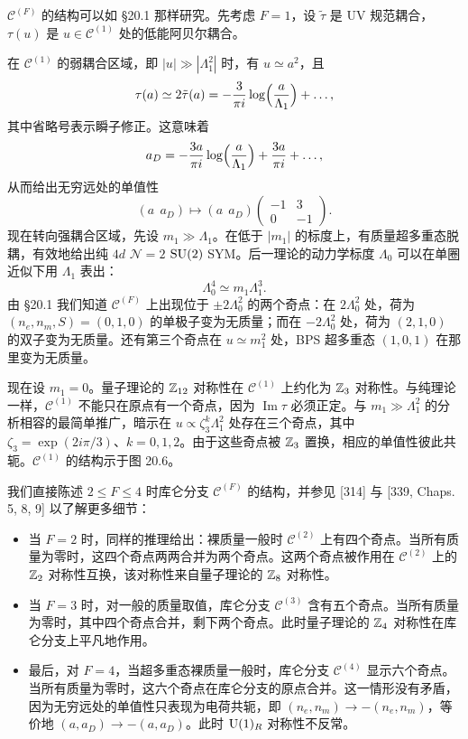 $\mathcal{C}^{(F)}$ 的结构可以如 §20.1 那样研究。先考虑 $F=1$，设 $\tilde\tau$ 是 UV 规范耦合，$\tau(u)$ 是 $u\in\mathcal{C}^{(1)}$ 处的低能阿贝尔耦合。

在 $\mathcal{C}^{(1)}$ 的弱耦合区域，即 $|u|\gg|\Lambda_1^2|$ 时，有 $u\simeq a^2$，且
\[
\tau(a)\simeq2\tilde\tau(a)=-\frac{3}{\pi i}\log\Bigl(\frac{a}{\Lambda_1}\Bigr)+\dots,
\]
其中省略号表示瞬子修正。这意味着
\[
a_D=-\frac{3a}{\pi i}\log\Bigl(\frac{a}{\Lambda_1}\Bigr)+\frac{3a}{\pi i}+\dots,
\]
从而给出无穷远处的单值性
\[
(a\ \ a_D)\longmapsto(a\ \ a_D)\begin{pmatrix}-1&3\\0&-1\end{pmatrix}.
\]
现在转向强耦合区域，先设 $m_1\gg\Lambda_1$。在低于 $|m_1|$ 的标度上，有质量超多重态脱耦，有效地给出纯 $4d$ $\mathcal{N}=2$ $\operatorname{SU}(2)$ SYM。后一理论的动力学标度 $\Lambda_0$ 可以在单圈近似下用 $\Lambda_1$ 表出：
\[
\Lambda_0^4\simeq m_1\Lambda_1^3.
\]
由 §20.1 我们知道 $\mathcal{C}^{(F)}$ 上出现位于 $\pm2\Lambda_0^2$ 的两个奇点：在 $2\Lambda_0^2$ 处，荷为 $(n_e,n_m,S)=(0,1,0)$ 的单极子变为无质量；而在 $-2\Lambda_0^2$ 处，荷为 $(2,1,0)$ 的双子变为无质量。还有第三个奇点在 $u\simeq m_1^2$ 处，BPS 超多重态 $(1,0,1)$ 在那里变为无质量。

现在设 $m_1=0$。量子理论的 $\mathbb{Z}_{12}$ 对称性在 $\mathcal{C}^{(1)}$ 上约化为 $\mathbb{Z}_3$ 对称性。与纯理论一样，$\mathcal{C}^{(1)}$ 不能只在原点有一个奇点，因为 $\operatorname{Im}\tau$ 必须正定。与 $m_1\gg\Lambda_1^2$ 的分析相容的最简单推广，暗示在 $u\propto\zeta_3^k\Lambda_1^2$ 处存在三个奇点，其中 $\zeta_3=\exp(2i\pi/3)$、$k=0,1,2$。由于这些奇点被 $\mathbb{Z}_3$ 置换，相应的单值性彼此共轭。$\mathcal{C}^{(1)}$ 的结构示于图 20.6。

我们直接陈述 $2\le F\le4$ 时库仑分支 $\mathcal{C}^{(F)}$ 的结构，并参见 [314] 与 [339, Chaps. 5, 8, 9] 以了解更多细节：


\begin{itemize}
\item 当 $F=2$ 时，同样的推理给出：裸质量一般时 $\mathcal{C}^{(2)}$ 上有四个奇点。当所有质量为零时，这四个奇点两两合并为两个奇点。这两个奇点被作用在 $\mathcal{C}^{(2)}$ 上的 $\mathbb{Z}_2$ 对称性互换，该对称性来自量子理论的 $\mathbb{Z}_8$ 对称性。
\item 当 $F=3$ 时，对一般的质量取值，库仑分支 $\mathcal{C}^{(3)}$ 含有五个奇点。当所有质量为零时，其中四个奇点合并，剩下两个奇点。此时量子理论的 $\mathbb{Z}_4$ 对称性在库仑分支上平凡地作用。
\item 最后，对 $F=4$，当超多重态裸质量一般时，库仑分支 $\mathcal{C}^{(4)}$ 显示六个奇点。当所有质量为零时，这六个奇点在库仑分支的原点合并。这一情形没有矛盾，因为无穷远处的单值性只表现为电荷共轭，即 $(n_e,n_m)\to-(n_e,n_m)$，等价地 $(a,a_D)\to-(a,a_D)$。此时 $\operatorname{U}(1)_R$ 对称性不反常。
\end{itemize}

